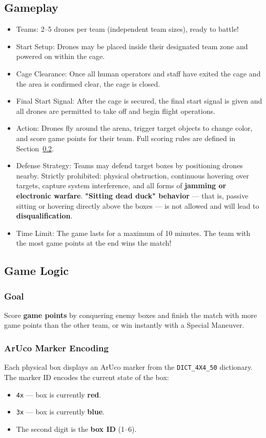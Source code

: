 \subsection{Gameplay}
\label{sec:gameplay}
\begin{itemize}
	\item{Teams: 2--5 drones per team (independent team sizes), ready to battle!}
	\item{Start Setup: Drones may be placed inside their designated team zone and powered on within the cage.}
	\item{Cage Clearance: Once all human operators and staff have exited the cage and the area is confirmed clear, the cage is closed.}
	\item{Final Start Signal: After the cage is secured, the final start signal is given and all drones are permitted to take off and begin flight operations.}
	\item{Action: Drones fly around the arena, trigger target objects to change color, and score game points for their team. Full scoring rules are defined in Section~\ref{sec:game-logic}.}
\item{Defense Strategy:
	Teams may defend target boxes by positioning drones nearby.
	Strictly prohibited: physical obstruction, continuous hovering over targets, capture system interference, and all forms of \textbf{jamming or electronic warfare}.
	\textbf{"Sitting dead duck" behavior} — that is, passive sitting or hovering directly above the boxes — is not allowed and will lead to \textbf{disqualification}.}
	\item{Time Limit: The game lasts for a maximum of 10 minutes. The team with the most game points at the end wins the match!}
\end{itemize}

\subsection{Game Logic}
\label{sec:game-logic}

\subsubsection{Goal}
Score \textbf{game points} by conquering enemy boxes and finish the match with more game points than the other team, or win instantly with a Special Maneuver.


\subsubsection{ArUco Marker Encoding}
Each physical box displays an ArUco marker from the \texttt{DICT\_4X4\_50} dictionary. The marker ID encodes the current state of the box:
\begin{itemize}
	\item{\texttt{4x} — box is currently \textbf{red}.}
	\item{\texttt{3x} — box is currently \textbf{blue}.}
	\item{The second digit is the \textbf{box ID} (1--6).}
\end{itemize}

